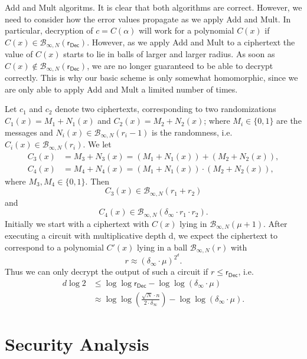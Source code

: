 \documentclass[a4paper, 12pt]{article}
\newcommand{\mc}[1]{\mathcal{#1}}
\newcommand{\tsf}[1]{\textsf{#1}}
\begin{document}
	\begin{paralgorithm}{\tsf{Add} and \tsf{Mult} algoritms.}
		It is clear that both algorithms are correct. However, we need to consider how the error values propagate as we apply \tsf{Add} and \tsf{Mult}. 
		In particular, decryption of $c = C(\alpha)$ will work for a polynomial $C(x)$ if $C(x) \in \mc{B}_{\infty,N}(\tsf{r}_\tsf{Dec})$. 
		However, as we apply \tsf{Add} and \tsf{Mult} to a ciphertext the value of $C(x)$ starts to lie in balls of larger and larger radius. 
		As soon as	 $C(x) \not\in \mc{B}_{\infty,N}(\tsf{r}_\tsf{Dec})$, we are no longer guaranteed to be able to decrypt correctly.
		This is why our basic scheme is only somewhat homomorphic, since we are only
		able to apply \tsf{Add} and \tsf{Mult} a limited number of times.
		
		Let $c_1$ and $c_2$ denote two ciphertexts, corresponding to two randomizations $C_1(x) = M_1 + N_1(x)$ and $C_2(x) = M_2 + N_2(x)$; where $M_i \in \{0, 1\}$ are the messages and $N_i(x) \in \mc{B}_{\infty,N}(r_i - 1)$ is the randomness, i.e. $C_i(x) \in \mc{B}_{\infty,N}(r_i)$. 
		We let
		\begin{align*}
		C_3(x) &= M_3 + N_3(x) = (M_1 + N_1(x)) + (M_2 + N_2(x)),\\
		C_4(x) &= M_4 + N_4(x) = (M_1+ N_1(x)) \cdot (M_2 + N_2(x)),
		\end{align*} %
		where $M_3, M_4 \in \{0, 1\}$. Then
		\[
		C_3(x) \in \mc{B}_{\infty, N}(r_1 + r_2)
		\]
		and
		\[
		C_4(x) \in \mc{B}_{\infty, N}(\delta_\infty \cdot r_1 \cdot r_2).
		\]
		Initially we start with a ciphertext with $C(x)$ lying in $\mc{B}_{\infty, N}(\mu + 1)$.
		After executing a circuit with multiplicative depth d, we expect the ciphertext to correspond to a polynomial $C'(x)$ lying in a ball $\mc{B}_{\infty, N}(r)$ with
		\[
		r \approx (\delta_\infty \cdot \mu)^{2^d}.
		\]
		Thus we can only decrypt the output of such a circuit if $r \leqslant \tsf{r}_\tsf{Dec}$, i.e.
		\begin{align*}
		d \log 2 &\leqslant \log{\log \tsf{r}_\tsf{Dec}} - \log{\log (\delta_\infty \cdot \mu)} 
		\\ &\approx \log{\log{\left(\frac{\sqrt{N} \cdot n}{2 \cdot \delta_\infty}\right)}} - \log{\log(\delta_\infty \cdot \mu)}.
		\end{align*}
	\end{paralgorithm}
	
	\section{Security Analysis}
	
\end{document}
